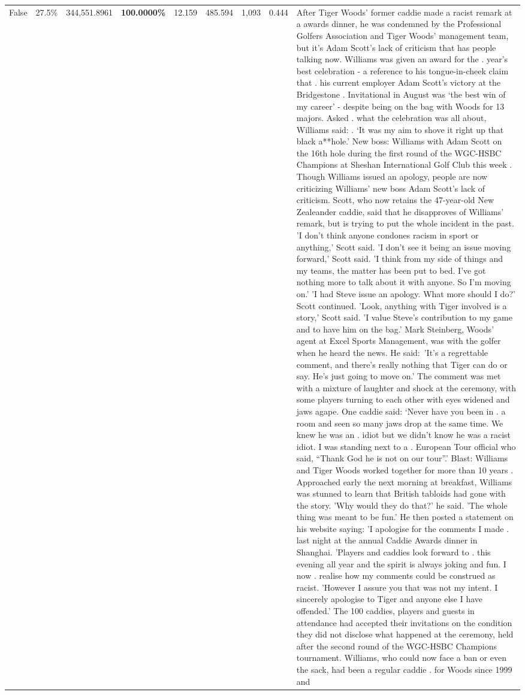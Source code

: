 \begin{table}[H]
\begin{tabular}{lllrlllll}
False & 27.5\% & 344,551.8961 & \bfseries \color{red} 100.0000\% & 12.159 & 485.594 & 1,093 & 0.444 & After Tiger Woods' former caddie made a racist remark at a awards dinner, he was condemned by the Professional Golfers Association and Tiger Woods' management team, but it's Adam Scott's lack of criticism that has people talking now. Williams was given an award for the . year’s best celebration - a reference to his tongue-in-cheek claim that . his current employer Adam Scott’s victory at the Bridgestone . Invitational in August was ‘the best win of my career’ - despite being on the bag with Woods for 13 majors. Asked . what the celebration was all about, Williams said: . ‘It was my aim to shove it right up that black a**hole.’ New boss: Williams with Adam Scott  on the 16th hole during the first round of the WGC-HSBC Champions at Sheshan International Golf Club this week . Though Williams issued an apology, people are now criticizing Williams' new boss Adam Scott's lack of criticism. Scott, who now retains the 47-year-old New Zealeander caddie, said that he disapproves of Williams' remark, but is trying to put the whole incident in the past. 'I don't think anyone condones racism in sport or anything,' Scott said. 'I don't see it being an issue moving forward,' Scott said. 'I think from my side of things and my teams, the matter has been put to bed. I've got nothing more to talk about it with anyone. So I'm moving on.' 'I had Steve issue an apology. What more should I do?' Scott continued. 'Look, anything with Tiger involved is a story,' Scott said. 'I value Steve's contribution to my game and to have him on the bag.' Mark Steinberg, Woods' agent at Excel Sports Management, was with the golfer when he heard the news. He said: 'It's a regrettable comment, and there's really nothing that Tiger can do or say. He's just going to move on.' The comment was met with a mixture of laughter and shock at the ceremony, with some players turning to each other with eyes widened and jaws agape. One caddie said: ‘Never have you been in . a room and seen so many jaws drop at the same time. We knew he was an . idiot but we didn’t know he was a racist idiot. I was standing next to a . European Tour official who said, “Thank God he is not on our tour”.’ Blast: Williams and Tiger Woods worked together for more than 10 years . Approached early the next morning at breakfast, Williams was stunned to learn that British tabloids had gone with the story. 'Why would they do that?' he said. 'The whole thing was meant to be fun.' He then posted a statement on his website saying: 'I apologise for the comments I made . last night at the annual Caddie Awards dinner in Shanghai. 'Players and caddies look forward to . this evening all year and the spirit is always joking and fun. I now . realise how my comments could be construed as racist. 'However I assure you that was not my intent. I sincerely apologise to Tiger and anyone else I have offended.' The 100 caddies, players and guests in attendance had accepted their invitations on the condition they did not disclose what happened at the ceremony, held after the second round of the WGC-HSBC Champions tournament. Williams, who could now face a ban or even the sack, had been a regular caddie . for Woods since 1999 and 
\end{tabular}
\end{table}
